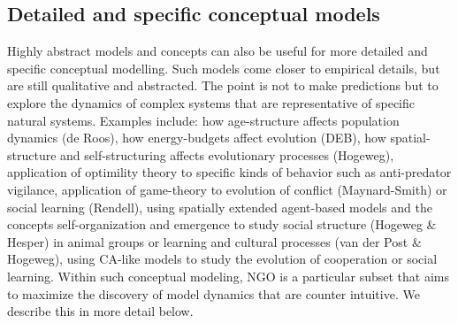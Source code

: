 \subsection{Detailed and specific conceptual models}

Highly abstract models and concepts can also be useful for more detailed and specific conceptual modelling. Such models come closer to empirical details, but are still qualitative and abstracted. The point is not to make predictions but to explore the dynamics of complex systems that are representative of specific natural systems. Examples include: how age-structure affects population dynamics (de Roos), how energy-budgets affect evolution (DEB), how spatial-structure and self-structuring affects evolutionary processes (Hogeweg), application of optimility theory to specific kinds of behavior such as anti-predator vigilance, application of game-theory to evolution of conflict (Maynard-Smith) or social learning (Rendell), using spatially extended agent-based models and the concepts self-organization and emergence to study social structure (Hogeweg & Hesper) in animal groups or learning and cultural processes (van der Post & Hogeweg), using CA-like models to study the evolution of cooperation or social learning.
Within such conceptual modeling, NGO is a particular subset that aims to maximize the discovery of model dynamics that are counter intuitive. We describe this in more detail below.
  